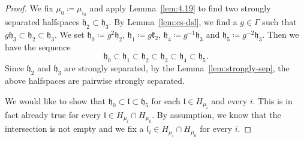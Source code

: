 \begin{proof}
  We fix \(\mu_0\coloneqq \mu_{i_0}\) and apply Lemma~\ref{lem:4.19} to find two strongly separated halfspaces \(\mathfrak{h_2} \subset \mathfrak{h_3}\). By Lemma~\ref{lem:cs-dsl}, we find a \(g \in \Gamma\) such that \(g\mathfrak{h}_3 \subset \mathfrak{h}_2 \subset \mathfrak{h}_3\). We set \(\mathfrak{h}_0 \coloneqq g^2 \mathfrak{h}_2\), \(\mathfrak{h}_1 \coloneqq g\mathfrak{k}_2\), \(\mathfrak{h}_4 \coloneqq g^{-1}\mathfrak{h}_3\) and \(\mathfrak{h}_5 \coloneqq g^{-2} \mathfrak{h}_3\). Then we have the sequence
  \[
    \mathfrak{h}_0 \subset \mathfrak{h}_1 \subset \mathfrak{h}_2 \subset \mathfrak{h}_3 \subset \mathfrak{h}_4 \subset \mathfrak{h}_5.
  \]
  Since \(\mathfrak{h}_2\) and \(\mathfrak{h}_3\) are strongly separated, by the Lemma~\ref{lem:strongly-sep}, the above halfspaces are pairwise strongly separated.

  We would like to show that \(\mathfrak{h}_0 \subset \mathfrak{l} \subset \mathfrak{h}_5\) for each \(\mathfrak{l} \in H_{\mu_i}\) and every \(i\). This is in fact already true for every \(\mathfrak{l} \in H_{\mu_i} \cap H_{\mu_0}\). By assumption, we know that the intersection is not empty and we fix a \(\mathfrak{l}_i \in H_{\mu_i} \cap H_{\mu_0}\) for every \(i\).


\end{proof}
